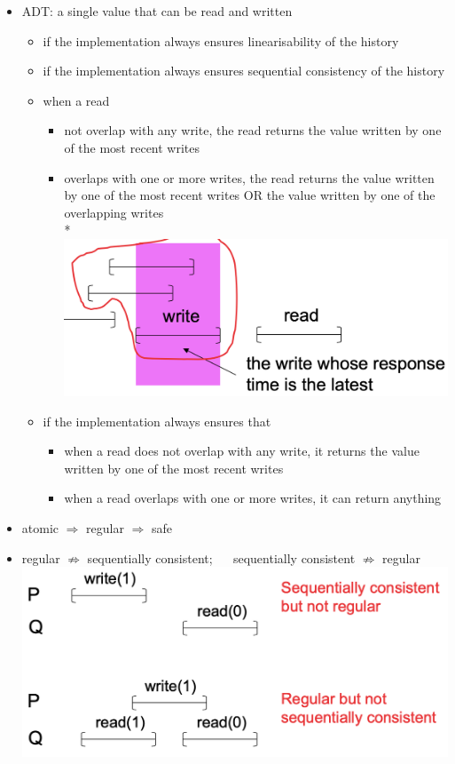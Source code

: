 \documentclass[10pt, landscape]{article}
\begin{document}
\begin{multicols*}{3}
  \begin{itemize}
    \item {} ADT: a single value that can be read and written
      \begin{itemize}
        \item {} if the implementation always ensures linearisability of the history
        \item {} if the implementation always ensures sequential consistency of the history
        \item {} when a read
          \begin{itemize}
            \item not overlap with any write, the read returns the value written by one of the most recent writes
            \item overlaps with one or more writes, the read returns the value written by one of the most recent writes OR the value written by one of the overlapping writes
              \\* \includegraphics[width=0.5\linewidth]{cs4231-register-recent-writes.png} 
          \end{itemize}
        \item {} if the implementation always ensures that
          \begin{itemize}
            \item when a read does not overlap with any write, it returns the value written by one of the most recent writes
            \item when a read overlaps with one or more writes, it can return anything
          \end{itemize}
      \end{itemize}
    \item \attention atomic $\Rightarrow$ regular $\Rightarrow$ safe
    \item regular $\not\Rightarrow$ sequentially consistent; $\quad$ sequentially consistent $\not\Rightarrow$ regular
      \includegraphics[width=0.6\linewidth]{cs4231-register-regular-seq-consistent.png} 
  \end{itemize}


\end{multicols*}
\end{document}
